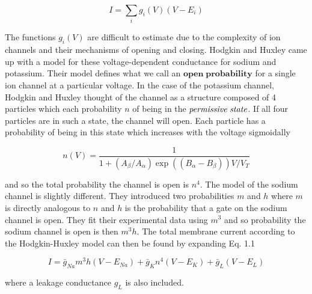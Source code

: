 \documentclass[a4paper,11pt]{book}
\begin{document}
\begin{equation}
I = \sum_{i} g_{i}(V)(V-E_{i})
\end{equation}

The functions $g_{i}(V)$ are difficult to estimate due to the complexity of ion channels and their mechanisms of opening and closing. Hodgkin and Huxley came up with a model for these voltage-dependent conductance for sodium and potassium. Their model defines what we call an $\mathbf{open \; probability}$ for a single ion channel at a particular voltage. In the case of the potassium channel, Hodgkin and Huxley thought of the channel as a structure composed of 4 particles which each probability $n$ of being in the $\it{permissive\; state}$. If all four particles are in such a state, the channel will open. Each particle has a probability of being in this state which increases with the voltage sigmoidally

\begin{equation}
n(V) = \frac{1}{1+(A_{\beta}/A_{\alpha})\exp ((B_{\alpha} - B_{\beta}))V/V_{T}}
\end{equation}

and so the total probability the channel is open is $n^{4}$. The model of the sodium channel is slightly different. They introduced two probabilities $m$ and $h$ where $m$ is directly analogous to $n$ and $h$ is the probability that a gate on the sodium channel is open. They fit their experimental data using $m^{3}$ and so  probability the sodium channel is open is then $m^{3}h$. The total membrane current according to the Hodgkin-Huxley model can then be found by expanding Eq. 1.1

\begin{equation}
I = \bar{g}_{Na}m^{3}h(V-E_{Na}) + \bar{g}_{K}n^{4}(V-E_{K}) + \bar{g}_{L}(V-E_{L})
\end{equation}

where a leakage conductance $g_{L}$ is also included.
\end{document}
